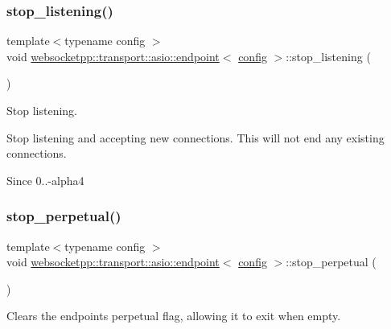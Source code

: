 \subsubsection{\texorpdfstring{stop\+\_\+listening()}{stop\_listening()}\hspace{0.1cm}{\footnotesize\ttfamily [2/2]}}
{\footnotesize\ttfamily template$<$typename config $>$ \\
void \mbox{\hyperlink{classwebsocketpp_1_1transport_1_1asio_1_1endpoint}{websocketpp\+::transport\+::asio\+::endpoint}}$<$ \mbox{\hyperlink{classconfig}{config}} $>$\+::stop\+\_\+listening (\begin{DoxyParamCaption}{ }\end{DoxyParamCaption})\hspace{0.3cm}{\ttfamily [inline]}}



Stop listening. 

Stop listening and accepting new connections. This will not end any existing connections.

\begin{DoxySince}{Since}
0..-\/alpha4 
\end{DoxySince}
\mbox{\label{classwebsocketpp_1_1transport_1_1asio_1_1endpoint_aaaf8c9ef3f41be6968674bd704dc23b0}} 
\subsubsection{\texorpdfstring{stop\+\_\+perpetual()}{stop\_perpetual()}}
{\footnotesize\ttfamily template$<$typename config $>$ \\
void \mbox{\hyperlink{classwebsocketpp_1_1transport_1_1asio_1_1endpoint}{websocketpp\+::transport\+::asio\+::endpoint}}$<$ \mbox{\hyperlink{classconfig}{config}} $>$\+::stop\+\_\+perpetual (\begin{DoxyParamCaption}{ }\end{DoxyParamCaption})\hspace{0.3cm}{\ttfamily [inline]}}



Clears the endpoint\textquotesingle{}s perpetual flag, allowing it to exit when empty. 

